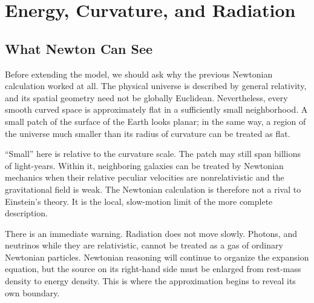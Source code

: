 \chapter{Energy, Curvature, and Radiation}


\section{What Newton Can See}

Before extending the model, we should ask why the previous Newtonian calculation worked at all. The physical universe is described by general relativity, and its spatial geometry need not be globally Euclidean. Nevertheless, every smooth curved space is approximately flat in a sufficiently small neighborhood. A small patch of the surface of the Earth looks planar; in the same way, a region of the universe much smaller than its radius of curvature can be treated as flat.

``Small'' here is relative to the curvature scale. The patch may still span billions of light-years. Within it, neighboring galaxies can be treated by Newtonian mechanics when their relative peculiar velocities are nonrelativistic and the gravitational field is weak. The Newtonian calculation is therefore not a rival to Einstein's theory. It is the local, slow-motion limit of the more complete description.

There is an immediate warning. Radiation does not move slowly. Photons, and neutrinos while they are relativistic, cannot be treated as a gas of ordinary Newtonian particles. Newtonian reasoning will continue to organize the expansion equation, but the source on its right-hand side must be enlarged from rest-mass density to energy density. This is where the approximation begins to reveal its own boundary.

